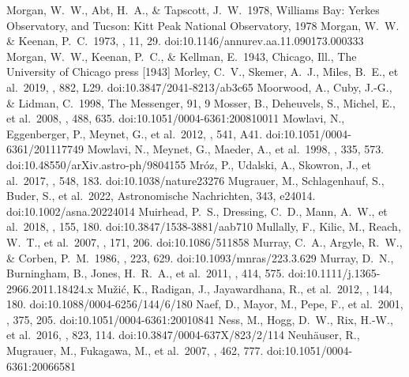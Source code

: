 \documentclass[twocolumn,tighten,twocolappendix]{aastex631}
\begin{document}
\begin{thebibliography}{}
 Morgan, W.~W., Abt, H.~A., \& Tapscott, J.~W.\ 1978, Williams Bay: Yerkes Observatory, and Tucson: Kitt Peak National Observatory, 1978
 Morgan, W.~W. \& Keenan, P.~C.\ 1973, \araa, 11, 29. doi:10.1146/annurev.aa.11.090173.000333
 Morgan, W.~W., Keenan, P.~C., \& Kellman, E.\ 1943, Chicago, Ill., The University of Chicago press [1943]
 Morley, C.~V., Skemer, A.~J., Miles, B.~E., et al.\ 2019, \apjl, 882, L29. doi:10.3847/2041-8213/ab3c65
 Moorwood, A., Cuby, J.-G., \& Lidman, C.\ 1998, The Messenger, 91, 9
 Mosser, B., Deheuvels, S., Michel, E., et al.\ 2008, \aap, 488, 635. doi:10.1051/0004-6361:200810011
 Mowlavi, N., Eggenberger, P., Meynet, G., et al.\ 2012, \aap, 541, A41. doi:10.1051/0004-6361/201117749
 Mowlavi, N., Meynet, G., Maeder, A., et al.\ 1998, \aap, 335, 573. doi:10.48550/arXiv.astro-ph/9804155
 Mr{\'o}z, P., Udalski, A., Skowron, J., et al.\ 2017, \nat, 548, 183. doi:10.1038/nature23276
 Mugrauer, M., Schlagenhauf, S., Buder, S., et al.\ 2022, Astronomische Nachrichten, 343, e24014. doi:10.1002/asna.20224014
 Muirhead, P.~S., Dressing, C.~D., Mann, A.~W., et al.\ 2018, \aj, 155, 180. doi:10.3847/1538-3881/aab710
 Mullally, F., Kilic, M., Reach, W.~T., et al.\ 2007, \apjs, 171, 206. doi:10.1086/511858
 Murray, C.~A., Argyle, R.~W., \& Corben, P.~M.\ 1986, \mnras, 223, 629. doi:10.1093/mnras/223.3.629
 Murray, D.~N., Burningham, B., Jones, H.~R.~A., et al.\ 2011, \mnras, 414, 575. doi:10.1111/j.1365-2966.2011.18424.x
 Mu{\v{z}}i{\'c}, K., Radigan, J., Jayawardhana, R., et al.\ 2012, \aj, 144, 180. doi:10.1088/0004-6256/144/6/180
 Naef, D., Mayor, M., Pepe, F., et al.\ 2001, \aap, 375, 205. doi:10.1051/0004-6361:20010841
 Ness, M., Hogg, D.~W., Rix, H.-W., et al.\ 2016, \apj, 823, 114. doi:10.3847/0004-637X/823/2/114
 Neuh{\"a}user, R., Mugrauer, M., Fukagawa, M., et al.\ 2007, \aap, 462, 777. doi:10.1051/0004-6361:20066581

\end{thebibliography}
\end{document}
